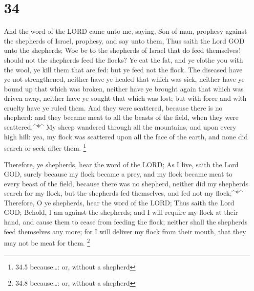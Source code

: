 \hypertarget{section-33}{%
\section{34}\label{section-33}}

 And the word of the LORD came unto me, saying, 
Son of man, prophesy against the shepherds of Israel, prophesy, and say
unto them, Thus saith the Lord GOD unto the shepherds; Woe be to the
shepherds of Israel that do feed themselves! should not the shepherds
feed the flocks?  Ye eat the fat, and ye clothe you with the
wool, ye kill them that are fed: but ye feed not the flock. 
The diseased have ye not strengthened, neither have ye healed that which
was sick, neither have ye bound up that which was broken, neither have
ye brought again that which was driven away, neither have ye sought that
which was lost; but with force and with cruelty have ye ruled them.
 And they were scattered, because there is no shepherd: and
they became meat to all the beasts of the field, when they were
scattered.\^{}*\^{}  My sheep wandered through all the
mountains, and upon every high hill: yea, my flock was scattered upon
all the face of the earth, and none did search or seek after them.
\footnote{34.5 because\ldots: or, without a shepherd}

 Therefore, ye shepherds, hear the word of the LORD;
 As I live, saith the Lord GOD, surely because my flock
became a prey, and my flock became meat to every beast of the field,
because there was no shepherd, neither did my shepherds search for my
flock, but the shepherds fed themselves, and fed not my flock;\^{}*\^{}
 Therefore, O ye shepherds, hear the word of the LORD;
 Thus saith the Lord GOD; Behold, I am against the
shepherds; and I will require my flock at their hand, and cause them to
cease from feeding the flock; neither shall the shepherds feed
themselves any more; for I will deliver my flock from their mouth, that
they may not be meat for them. \footnote{34.8 because\ldots: or, without
  a shepherd}

